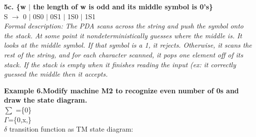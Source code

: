 \documentclass{scrartcl}
\begin{document}
\textbf{5c. \{w $|$ the length of w is odd and its middle symbol is 0's\}}\\

S $\rightarrow$ 0 $|$  0S0 $|$ 0S1 $|$ 1S0 $|$ 1S1 \\
\textit{Formal description: The PDA scans across the string and push the symbol onto the stack. At some point it nondeterministically guesses where the middle is. It looks at the middle symbol. If that symbol is a 1, it rejects. Otherwise, it scans the rest of the string, and for each character scanned, it pops one element off of its stack. If the stack is empty when it finishes reading the input (ex: it correctly guessed the middle then it accepts.}\\

\begin{center}
\end{center}
\textbf{ Example 6.Modify machine M2 to recognize even number of 0s and draw the state diagram.}\\
$\sum$ =\{0\}\\
$\Gamma$=\{0,x,\textvisiblespace\}\\
$\delta$ transition function as TM state diagram:\\
\end{document}
